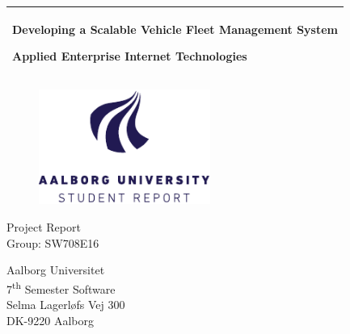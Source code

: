 %
\newcommand{\titlefont}{\sffamily\fontsize{36pt}{0pt}\selectfont}
\newcommand{\subtitlefont}{\sffamily\fontsize{26pt}{0pt}\selectfont}
\newcommand{\otherfont}{\sffamily\fontsize{18pt}{0pt}\selectfont}
\newcommand{\smallfont}{\sffamily\fontsize{12pt}{0pt}\selectfont}
\begin{titlepage}
    \addtolength{\hoffset}{0.5\evensidemargin-0.5\oddsidemargin} %
    \noindent%
    \begin{tabular}{@{}p{\textwidth}@{}}
        \toprule[2pt]
        \midrule
        \vspace{0.2cm}
        \begin{center}
        \titlefont Developing a Scalable Vehicle Fleet Management System
        \end{center}
    \vspace{0.1cm}
        \begin{center}
        \subtitlefont Applied Enterprise Internet Technologies
    \end{center}
        \vspace{0.2cm}\\
        \midrule
        \toprule[2pt]
    \end{tabular}
    \vspace{2 cm}
    \begin{figure}[h!]
        \centering
        \includegraphics[width=0.5\textwidth]{img/aau_logo_en.pdf}
    \end{figure}
    \vspace{3 cm}
    \begin{center}
        \otherfont
            Project Report
        \\
        \vspace{0.2cm}
        \otherfont
            Group: SW708E16
    \end{center}
    \vfill
    \begin{center}
    \smallfont
    Aalborg Universitet\\
    7\textsuperscript{th} Semester Software\\ \vspace{0.1cm}
    Selma Lagerløfs Vej 300\\
    DK-9220 Aalborg
    \end{center}
\end{titlepage}
\clearpage
\cleardoublepage
